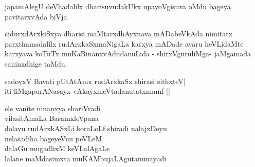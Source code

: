 \begin{entry}
{japamAlegU deVhadalilx dharisuvudakUkx upayoVgisuva oMdu bageya
pavitarxvAda biVja.

cidurxdArxkiSxya dharisi maMtarxdhAyxnava mADabeVkAda nimitatx
parxthamadalilx rudArxkaSxmaNigaLa karxya mADade avaru heVLidaMte
karxyava koTuTx muKaBinanxvAdudanuLida - shirxVguruliMga- jaMgamada
saninxdhige taMdu.}
\gl{}
\begin{shl}
sadoyxV Bavati pUtAtAmx rudArxkaSx shirasi sithxteV|\\
iti liMgapurANasayx vAkayxmeVtadanutatxmamf ||
\end{shl}
\gl{}
\begin{shl}
ele vanite ninanxya shariVradi\\
vilasitAmaLa BasamxleVpana\\
dolavu rudArxkASxLi koraLoLf shiradi nalajxDeyu\\
nelasadiha bageyeVnu peVLeM\\
dalaGu mugadhxM keVLalAgaLe\\
lalane maMdasimxta muKAMbujaLAgutanunayadi
\end{shl}
\end{entry}

